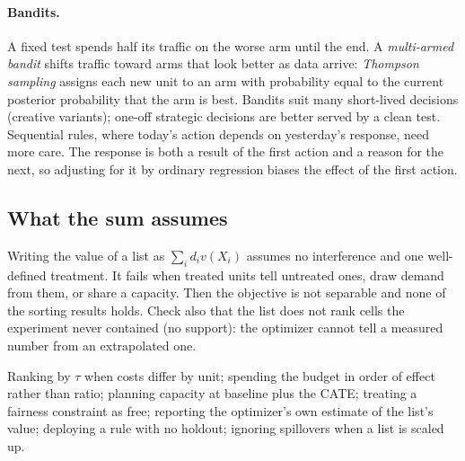 \documentclass[11pt]{article}
\begin{document}
\paragraph{Bandits.} A fixed test spends half its traffic on the worse arm until the end. A \emph{multi-armed bandit} shifts
traffic toward arms that look better as data arrive: \emph{Thompson sampling} assigns each new unit to an arm with
probability equal to the current posterior probability that the arm is best. Bandits suit many short-lived decisions
(creative variants); one-off strategic decisions are better served by a clean test. Sequential rules, where today's
action depends on yesterday's response, need more care. The response is both a result of the first action and a reason
for the next, so adjusting for it by ordinary regression biases the effect of the first action.

\subsection{What the sum assumes}\label{sec:sum}

Writing the value of a list as $\sum_i d_iv(X_i)$ assumes no interference and one well-defined treatment. It fails when
treated units tell untreated ones, draw demand from them, or share a capacity. Then the objective is not
separable and none of the sorting results holds. Check also that the list does not rank cells the experiment never
contained (no support): the optimizer cannot tell a measured number from an extrapolated one.

\begin{pitfall}
Ranking by $\tau$ when costs differ by unit; spending the budget in order of effect rather than ratio; planning capacity
at baseline plus the CATE; treating a fairness constraint as free; reporting the optimizer's own estimate of the list's
value; deploying a rule with no holdout; ignoring spillovers when a list is scaled up.
\end{pitfall}

\sectiontwo
\end{document}

